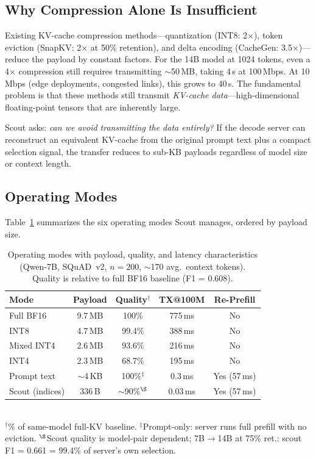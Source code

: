 \documentclass{article}
\begin{document}
\subsection{Why Compression Alone Is Insufficient}

Existing KV-cache compression methods---quantization (INT8: 2$\times$), token eviction (SnapKV: 2$\times$ at 50\% retention), and delta encoding (CacheGen: 3.5$\times$)---reduce the payload by constant factors.
For the 14B model at 1024 tokens, even a 4$\times$ compression still requires transmitting $\sim$50\,MB, taking 4\,s at 100\,Mbps.
At 10\,Mbps (edge deployments, congested links), this grows to 40\,s.
The fundamental problem is that these methods still transmit \emph{KV-cache data}---high-dimensional floating-point tensors that are inherently large.

Scout asks: \emph{can we avoid transmitting the data entirely?}
If the decode server can reconstruct an equivalent KV-cache from the original prompt text plus a compact selection signal, the transfer reduces to sub-KB payloads regardless of model size or context length.

\subsection{Operating Modes}

Table~\ref{tab:operating_points} summarizes the six operating modes Scout manages, ordered by payload size.

\begin{table}[t]
\centering
\caption{Operating modes with payload, quality, and latency characteristics (Qwen-7B, SQuAD~v2, $n = 200$, $\sim$170 avg.\ context tokens). Quality is relative to full BF16 baseline (F1 = 0.608).}
\label{tab:operating_points}
\small
\begin{tabular}{@{}lcccc@{}}
\toprule
\textbf{Mode} & \textbf{Payload} & \textbf{Quality$^\dagger$} & \textbf{TX@100M} & \textbf{Re-Prefill} \\
\midrule
Full BF16       & 9.7\,MB   & 100\%  & 775\,ms & No \\
INT8            & 4.7\,MB   & 99.4\% & 388\,ms & No \\
Mixed INT4      & 2.6\,MB   & 93.6\% & 216\,ms & No \\
INT4            & 2.3\,MB   & 68.7\% & 195\,ms & No \\
\midrule
Prompt text     & $\sim$4\,KB & 100\%$^\ddagger$ & 0.3\,ms & Yes (57\,ms) \\
Scout (indices) & 336\,B    & $\sim$90\%$^\S$ & 0.03\,ms & Yes (57\,ms) \\
\bottomrule
\end{tabular}\\[2pt]
{\scriptsize $^\dagger$\% of same-model full-KV baseline.
$^\ddagger$Prompt-only: server runs full prefill with no eviction.
$^\S$Scout quality is model-pair dependent; 7B$\to$14B at 75\% ret.: scout F1 = 0.661 = 99.4\% of server's own selection.}
\end{table}
\end{document}
